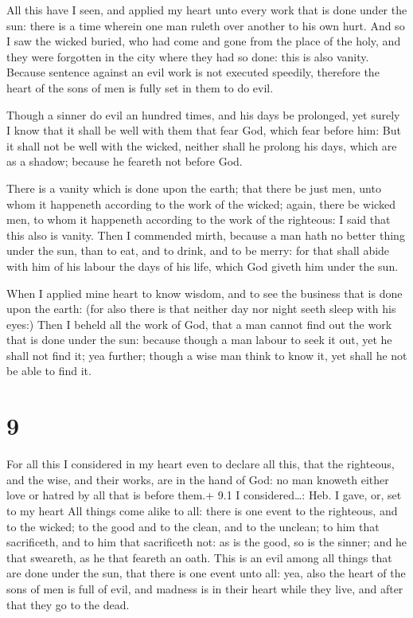  All this have I seen, and applied my heart unto every work
that is done under the sun: there is a time wherein one man ruleth over
another to his own hurt.  And so I saw the wicked buried,
who had come and gone from the place of the holy, and they were
forgotten in the city where they had so done: this is also vanity.
 Because sentence against an evil work is not executed
speedily, therefore the heart of the sons of men is fully set in them to
do evil.

 Though a sinner do evil an hundred times, and his days
be prolonged, yet surely I know that it shall be well with them that
fear God, which fear before him:  But it shall not be well
with the wicked, neither shall he prolong his days, which are as a
shadow; because he feareth not before God.

 There is a vanity which is done upon the earth; that there
be just men, unto whom it happeneth according to the work of the wicked;
again, there be wicked men, to whom it happeneth according to the work
of the righteous: I said that this also is vanity.  Then I
commended mirth, because a man hath no better thing under the sun, than
to eat, and to drink, and to be merry: for that shall abide with him of
his labour the days of his life, which God giveth him under the sun.

 When I applied mine heart to know wisdom, and to see the
business that is done upon the earth: (for also there is that neither
day nor night seeth sleep with his eyes:)  Then I beheld
all the work of God, that a man cannot find out the work that is done
under the sun: because though a man labour to seek it out, yet he shall
not find it; yea further; though a wise man think to know it, yet shall
he not be able to find it.

\hypertarget{section-8}{%
\section{9}\label{section-8}}

 For all this I considered in my heart even to declare all
this, that the righteous, and the wise, and their works, are in the hand
of God: no man knoweth either love or hatred by all that is before
them.+ 9.1 I considered\ldots: Heb. I gave, or, set to my heart
 All things come alike to all: there is one event to the
righteous, and to the wicked; to the good and to the clean, and to the
unclean; to him that sacrificeth, and to him that sacrificeth not: as is
the good, so is the sinner; and he that sweareth, as he that feareth an
oath.  This is an evil among all things that are done under
the sun, that there is one event unto all: yea, also the heart of the
sons of men is full of evil, and madness is in their heart while they
live, and after that they go to the dead.

